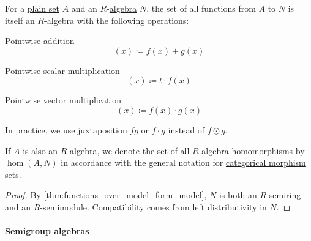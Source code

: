 \begin{proposition}\label{thm:functions_over_algebra}
  For a \hyperref[def:set]{plain set} \( A \) and an \( R \)-\hyperref[def:algebra_over_semiring]{algebra} \( N \), the set of all functions from \( A \) to \( N \) is itself an \( R \)-algebra with the following operations:
  \begin{thmenum}
     Pointwise addition
    \begin{equation*}
      [f + g](x) \coloneqq f(x) + g(x)
    \end{equation*}

     Pointwise scalar multiplication
    \begin{equation*}
      [t \cdot f](x) \coloneqq t \cdot f(x)
    \end{equation*}

     Pointwise vector multiplication
    \begin{equation*}
      [f \odot g](x) \coloneqq f(x) \cdot g(x)
    \end{equation*}

    In practice, we use juxtaposition \( fg \) or \( f \cdot g \) instead of \( f \odot g \).
  \end{thmenum}
\end{proposition}
\begin{comments}
  \item If \( A \) is also an \( R \)-algebra, we denote the set of all \( R \)-\hyperref[def:algebra_over_semiring/homomorphism]{algebra homomorphisms} by \( \hom(A, N) \) in accordance with the general notation for \hyperref[def:category/morphisms]{categorical morphism sets}.
\end{comments}
\begin{proof}
  By \cref{thm:functions_over_model_form_model}, \( N \) is both an \( R \)-semiring and an \( R \)-semimodule. Compatibility comes from left distributivity in \( N \).
\end{proof}

\paragraph{Semigroup algebras}

